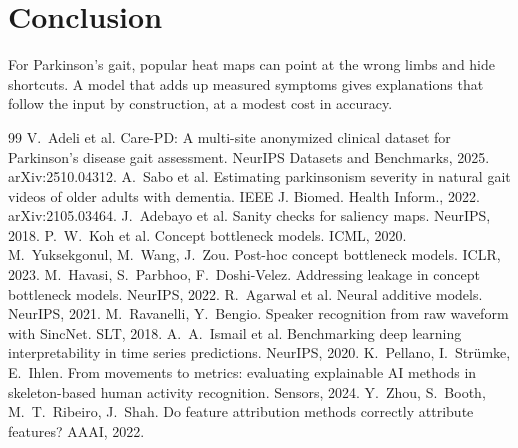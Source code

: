 \documentclass[10pt,twocolumn]{article}
\begin{document}
\section{Conclusion}
For Parkinson's gait, popular heat maps can point at the wrong limbs and hide shortcuts. A model that adds up
measured symptoms gives explanations that follow the input by construction, at a modest cost in accuracy.

\small

\begin{thebibliography}{99}
 V.~Adeli et al. Care-PD: A multi-site anonymized clinical dataset for Parkinson's disease gait assessment. NeurIPS Datasets and Benchmarks, 2025. arXiv:2510.04312.
 A.~Sabo et al. Estimating parkinsonism severity in natural gait videos of older adults with dementia. IEEE J. Biomed. Health Inform., 2022. arXiv:2105.03464.
 J.~Adebayo et al. Sanity checks for saliency maps. NeurIPS, 2018.
 P.~W.~Koh et al. Concept bottleneck models. ICML, 2020.
 M.~Yuksekgonul, M.~Wang, J.~Zou. Post-hoc concept bottleneck models. ICLR, 2023.
 M.~Havasi, S.~Parbhoo, F.~Doshi-Velez. Addressing leakage in concept bottleneck models. NeurIPS, 2022.
 R.~Agarwal et al. Neural additive models. NeurIPS, 2021.
 M.~Ravanelli, Y.~Bengio. Speaker recognition from raw waveform with SincNet. SLT, 2018.
 A.~A.~Ismail et al. Benchmarking deep learning interpretability in time series predictions. NeurIPS, 2020.
 K.~Pellano, I.~Str\"umke, E.~Ihlen. From movements to metrics: evaluating explainable AI methods in skeleton-based human activity recognition. Sensors, 2024.
 Y.~Zhou, S.~Booth, M.~T.~Ribeiro, J.~Shah. Do feature attribution methods correctly attribute features? AAAI, 2022.
\end{thebibliography}
\end{document}
